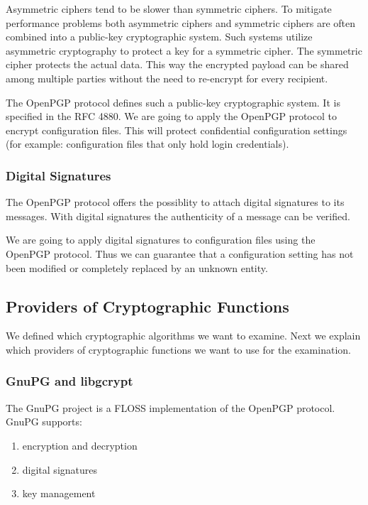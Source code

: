 Asymmetric ciphers tend to be slower than symmetric ciphers.
To mitigate performance problems both asymmetric ciphers and symmetric ciphers are often combined into a public-key cryptographic system.
Such systems utilize asymmetric cryptography to protect a key for a symmetric cipher.
The symmetric cipher protects the actual data.
This way the encrypted payload can be shared among multiple parties without the need to re-encrypt for every recipient.\cite{stallings2014}

The OpenPGP protocol defines such a public-key cryptographic system.
It is specified in the RFC 4880.\cite{rfc4880}
We are going to apply the OpenPGP protocol to encrypt configuration files.
This will protect confidential configuration settings (for example: configuration files that only hold login credentials).

\subsubsection{Digital Signatures}

The OpenPGP protocol offers the possiblity to attach digital signatures to its messages.\cite{rfc4880}
With digital signatures the authenticity of a message can be verified.\cite{bruceschneier1996,stallings2014}

We are going to apply digital signatures to configuration files using the OpenPGP protocol.
Thus we can guarantee that a configuration setting has not been modified or completely replaced by an unknown entity.

\subsection{Providers of Cryptographic Functions}
\label{intro-provider}

We defined which cryptographic algorithms we want to examine.
Next we explain which providers of cryptographic functions we want to use for the examination.

  \subsubsection{GnuPG and libgcrypt}

The GnuPG project is a FLOSS implementation of the OpenPGP protocol.
GnuPG supports:\cite{gnupg-doc}
\begin{enumerate}
\item encryption and decryption
\item digital signatures
\item key management
\end{enumerate}

